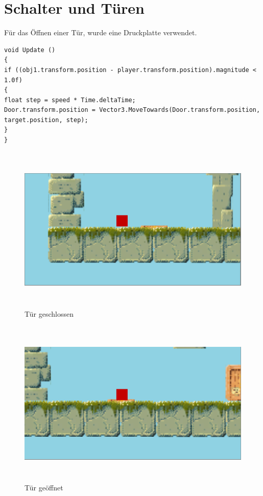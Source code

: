 \section{Schalter und Türen}
Für das Öffnen einer Tür, wurde eine Druckplatte verwendet. 
\begin{lstlisting}[language={[Sharp]C}, caption=PressurePlate-Script]
void Update ()
{
if ((obj1.transform.position - player.transform.position).magnitude < 1.0f)
{
float step = speed * Time.deltaTime;
Door.transform.position = Vector3.MoveTowards(Door.transform.position, target.position, step);
}
}
\end{lstlisting}

\begin{figure}[H]
	\includegraphics[height=8cm]{images/TuerZu.png}
	\caption{Tür geschlossen}
\end{figure}
\begin{figure}[H]
	\includegraphics[height=8cm]{images/TuerOffen.png}
	\caption{Tür geöffnet}
\end{figure}

